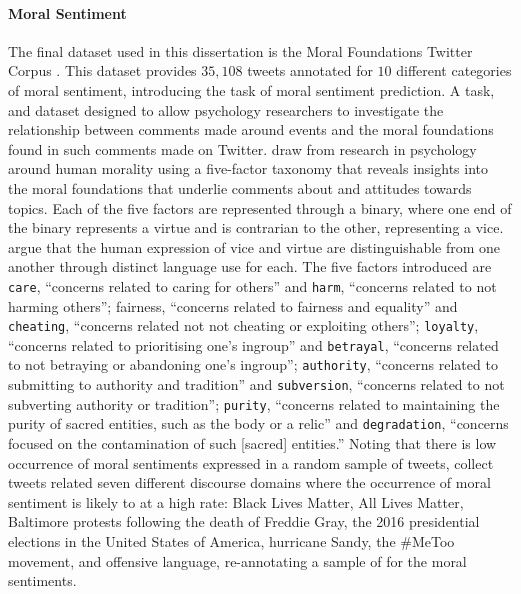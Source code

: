 \paragraph*{Moral Sentiment} The final dataset used in this dissertation is the Moral Foundations Twitter Corpus \citep{Hoover:2019}. This dataset provides $35,108$ tweets annotated for $10$ different categories of moral sentiment, introducing the task of moral sentiment prediction.
A task, and dataset designed to allow psychology researchers to investigate the relationship between comments made around events and the moral foundations found in such comments made on Twitter.
\citet{Hoover:2019} draw from research in psychology around human morality using a five-factor taxonomy that reveals insights into the moral foundations \citep{Graham:2009,Graham:2013} that underlie comments about and attitudes towards topics.
Each of the five factors are represented through a binary, where one end of the binary represents a virtue and is contrarian to the other, representing a vice.
\citet{Hoover:2019} argue that the human expression of vice and virtue are distinguishable from one another through distinct language use for each.
The five factors introduced are \texttt{care}, ``concerns related to caring for others'' and \texttt{harm}, ``concerns related to not harming others''; fairness, ``concerns related to fairness and equality'' and \texttt{cheating}, ``concerns related not not cheating or exploiting others''; \texttt{loyalty}, ``concerns related to prioritising one's ingroup'' and \texttt{betrayal}, ``concerns related to not betraying or abandoning one's ingroup''; \texttt{authority}, ``concerns related to submitting to authority and tradition'' and \texttt{subversion}, ``concerns related to not subverting authority or tradition''; \texttt{purity}, ``concerns related to maintaining the purity of sacred entities, such as the body or a relic'' and \texttt{degradation}, ``concerns focused on the contamination of such [sacred] entities.''
Noting that there is low occurrence of moral sentiments expressed in a random sample of tweets, \citet{Hoover:2019} collect tweets related seven different discourse domains where the occurrence of moral sentiment is likely to at a high rate: Black Lives Matter, All Lives Matter, Baltimore protests following the death of Freddie Gray, the 2016 presidential elections in the United States of America, hurricane Sandy, the \#MeToo movement, and offensive language, re-annotating a sample of \citet{Davidson:2017} for the moral sentiments.
